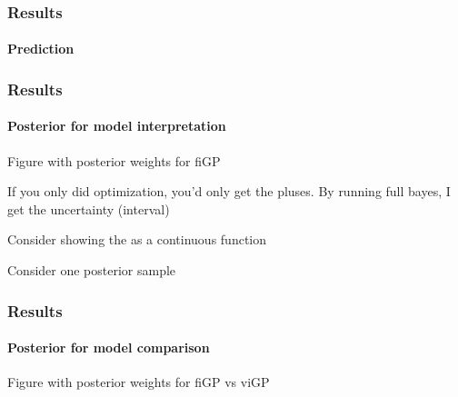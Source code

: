 \documentclass{snedecorbeamer}
\begin{document}
\begin{frame}[c]
  \frametitle{Results}
  \framesubtitle{Prediction}

  \begin{table}
    \caption*{%
      Mean validation statistics:~RMSE (left) and negative PPLD (right).\\
      Smaller values are better. Bold is best in class.
    }%
    \label{tab:validation-statistics-mini}
  \end{table}


\end{frame}

\begin{frame}
  \frametitle{Results}
  \framesubtitle{Posterior for model interpretation}

  Figure with posterior weights for fiGP

  If you only did optimization, you'd only get the pluses. By running full
  bayes, I get the uncertainty (interval)

  Consider showing the as a continuous function

  Consider one posterior sample
\end{frame}

\begin{frame}
  \frametitle{Results}
  \framesubtitle{Posterior for model comparison}

  Figure with posterior weights for fiGP vs viGP
\end{frame}

\end{document}
